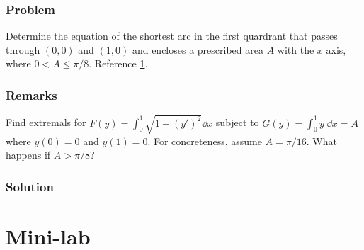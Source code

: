 \documentclass[12pt,twoside]{article}
\begin{document}
\subsubsection*{Problem}
Determine the equation of the shortest arc in the first quardrant that passes
through $(0,0)$ and $(1,0)$ and encloses a prescribed area $A$ with the $x$
axis, where $0<A\le\pi/8$. Reference \cref{fig:4.6.5}.
\begin{figure}[tp]
  \centering
  \caption{}
  \label{fig:4.6.5}
\end{figure}
\subsubsection*{Remarks}
Find extremals for $F(y)=\int_0^1\sqrt{1+{(y')}^2}\dd{x}$ subject to
$G(y)=\int_0^1y\;\dd{x}=A$ where $y(0)=0$ and $y(1)=0$. For concreteness, assume
$A=\pi/16$. What happens if $A>\pi/8$?
\subsubsection*{Solution}
\todo{}

\section{Mini-lab}
\todo{}
\end{document}
